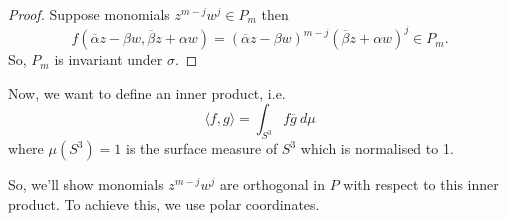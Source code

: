 \documentclass{article}
\begin{document}
\begin{proof}
    Suppose monomials $z^{m-j}w^{j} \in P_m$ then 
    \begin{equation}
        f(\overline{\alpha}z - \beta w, \overline{\beta}z + \alpha w)
        =
        (\overline{\alpha}z - \beta w)^{m-j} (\overline{\beta}z + \alpha w)^{j} \in P_m.
    \end{equation}
    So, $P_m$ is invariant under $\sigma$.
\end{proof}
Now, we want to define an inner product, i.e.
\begin{equation}
    \langle f,g \rangle = \int_{S^{3}} f \overline{g} \ d\mu
\end{equation}
where $\mu(S^{3})=1$ is the surface measure of $S^{3}$ which is normalised to 1.

So, we'll show monomials $z^{m-j}w^{j}$ are orthogonal in $P$ with respect to this inner product. To achieve this, we use polar coordinates.
\end{document}
